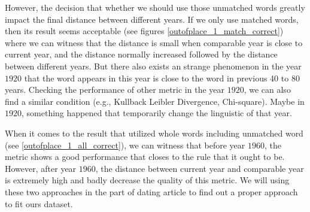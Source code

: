 However, the decision that whether we should use those unmatched words greatly impact the final distance between different years. If we only use matched words, then its result seems acceptable (see figures \ref{outofplace_1_match_correct}) where we can witness that the distance is small when comparable year is close to current year, and the distance normally increased followed by the distance between different years. But there also exists an strange phenomenon in the year $1920$ that the word appears in this year is close to the word in previous 40 to 80 years. Checking the performance of other metric in the year $1920$, we can also find a similar condition (e.g., Kullback Leibler Divergence, Chi-square). Maybe in $1920$, something happened that temporarily change the linguistic of that year. 

When it comes to the result that utilized whole words including unmatched word (see \ref{outofplace_1_all_correct}), we can witness that before year $1960$, the metric shows a good performance that closes to the rule that it ought to be. However, after year $1960$, the distance between current year and comparable year is extremely high and badly decrease the quality of this metric. We will using these two approaches in the part of dating article to find out a proper approach to fit ours dataset.

